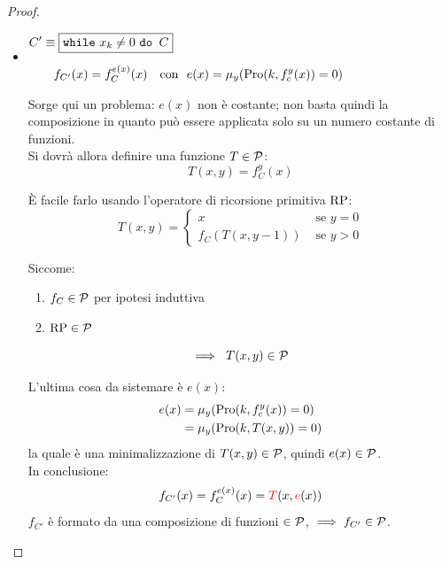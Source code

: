\begin{proof}
\begin{itemize}
\begin{itemize}
			Viene usata una composizione di $f_{C_i}$ ognuna delle quali è $\in\cp$ per ipotesi induttiva $\ \Rightarrow \ f_{C} \in \cp $
			
			\renewcommand{\labelitemii}{\raisebox{2.1\height}{$-$}}
			\item $\begin{aligned}
				&C'\equiv \boxed{\text{\texttt{while} } x_k \neq 0 \text{ \texttt{do }} C}\\[.6em]
				&\hspace{2em}f_{C'}(x) = f_C^{e(x)}(x)
				\ \ \text{ con } \ e(x)=\mu_y(\text{Pro}(k,f_c^y(x)) = 0)\\
			\end{aligned}$
			
			Sorge qui un problema: $e(x)$ non è costante; non basta quindi la composizione in quanto può essere applicata solo su un numero costante di funzioni. \\
			
			Si dovrà allora definire una funzione $T\in\mathcal{P}$:
			$$ T(x,y)=f_C^y(x) $$
			
			È facile farlo usando l'operatore di ricorsione primitiva $\text{RP}$:
			$$ T(x,y) = \begin{cases}
				x & \text{ se } y=0 \\
				f_C(T(x,y-1)) & \text{ se } y > 0
			\end{cases} $$
			
			Siccome:
			\begin{enumerate}
				\item $f_C \in \mathcal{P}$ per ipotesi induttiva
				\item $\text{RP} \in \mathcal{P}$
			\end{enumerate}
			$$ \implies \ T(x,y)\in \mathcal{P}$$
			
			L'ultima cosa da sistemare è $e(x)$:
			$$ \begin{aligned}
				e(x) & = \mu_y (\text{Pro}(k,f_c^y(x))=0) \\
				& =\mu_y(\text{Pro}(k,T(x,y)) = 0)
			\end{aligned} $$
			la quale è una minimalizzazione di $T(x,y) \in \mathcal{P}$, quindi $e(x)\in\mathcal{P}$.\\
			
			In conclusione:
			$$ f_{C'}(x) = f_C^{e(x)} (x) = {\color{red}T}(x,{\color{red}e}(x)) $$
			$f_{C'}$ è formato da una composizione di funzioni $\in\cp$, $ \implies f_{C'} \in \mathcal{P}$. \\
		\end{itemize}
	\end{itemize}
\end{proof}

